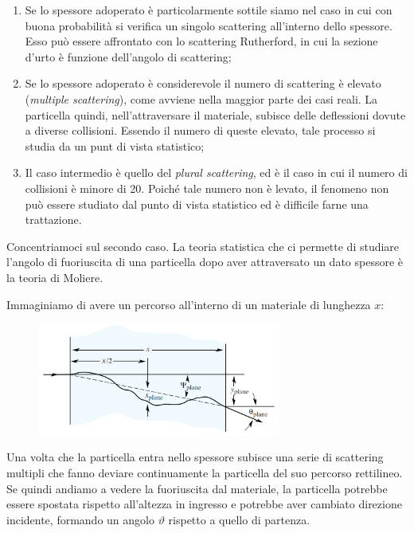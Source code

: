\begin{enumerate}
    \item Se lo spessore adoperato è particolarmente sottile siamo nel caso in cui con buona probabilità si verifica un singolo scattering all'interno dello spessore. Esso può essere affrontato con lo scattering Rutherford, in cui la sezione d'urto è funzione dell'angolo di scattering;
    \item Se lo spessore adoperato è considerevole il numero di scattering è elevato (\textit{multiple scattering}), come avviene nella maggior parte dei casi reali. La particella quindi, nell'attraversare il materiale, subisce delle deflessioni dovute a diverse collisioni. Essendo il numero di queste elevato, tale processo si studia da un punt di vista statistico;
    \item Il caso intermedio è quello del \textit{plural scattering}, ed è il caso in cui il numero di collisioni è minore di 20. Poiché tale numero non è levato, il fenomeno non può essere studiato dal punto di vista statistico ed è difficile farne una trattazione.
\end{enumerate}

Concentriamoci sul secondo caso. La teoria statistica che ci permette di studiare l'angolo di fuoriuscita di una particella dopo aver attraversato un dato spessore è la teoria di Moliere.

Immaginiamo di avere un percorso all'interno di un materiale di lunghezza $x$:

\vspace{-0.2cm}

\hspace{-0.2cm}\begin{minipage}{0.495\textwidth}
    \begin{figure}[H]
        \centering
        \includegraphics[width=8cm]{immagini/scattering_multiplo_1.png}
    \end{figure}
\end{minipage}
\hspace{0.2cm}\begin{minipage}{0.5\textwidth}
    \vspace{0.6cm}Una volta che la particella entra nello spessore subisce una serie di scattering multipli che fanno deviare continuamente la particella del suo percorso rettilineo. Se quindi andiamo a vedere la fuoriuscita dal materiale, la particella potrebbe essere spostata rispetto all'altezza in ingresso e potrebbe aver cambiato direzione incidente, formando un angolo $\vartheta$ rispetto a quello di partenza.
\end{minipage}

